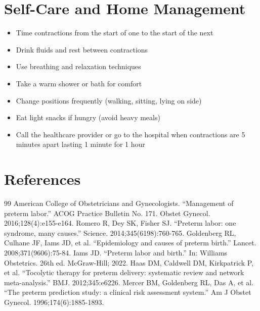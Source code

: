 \section*{Self-Care and Home Management}
\begin{itemize}
\item Time contractions from the start of one to the start of the next
\item Drink fluids and rest between contractions
\item Use breathing and relaxation techniques
\item Take a warm shower or bath for comfort
\item Change positions frequently (walking, sitting, lying on side)
\item Eat light snacks if hungry (avoid heavy meals)
\item Call the healthcare provider or go to the hospital when contractions are 5 minutes apart lasting 1 minute for 1 hour
\end{itemize}

\section*{References}
\begin{thebibliography}{99}
 American College of Obstetricians and Gynecologists. ``Management of preterm labor.'' ACOG Practice Bulletin No. 171. Obstet Gynecol. 2016;128(4):e155-e164.
 Romero R, Dey SK, Fisher SJ. ``Preterm labor: one syndrome, many causes.'' Science. 2014;345(6198):760-765.
 Goldenberg RL, Culhane JF, Iams JD, et al. ``Epidemiology and causes of preterm birth.'' Lancet. 2008;371(9606):75-84.
 Iams JD. ``Preterm labor and birth.'' In: Williams Obstetrics. 26th ed. McGraw-Hill; 2022.
 Haas DM, Caldwell DM, Kirkpatrick P, et al. ``Tocolytic therapy for preterm delivery: systematic review and network meta-analysis.'' BMJ. 2012;345:e6226.
 Mercer BM, Goldenberg RL, Das A, et al. ``The preterm prediction study: a clinical risk assessment system.'' Am J Obstet Gynecol. 1996;174(6):1885-1893.
\end{thebibliography}
